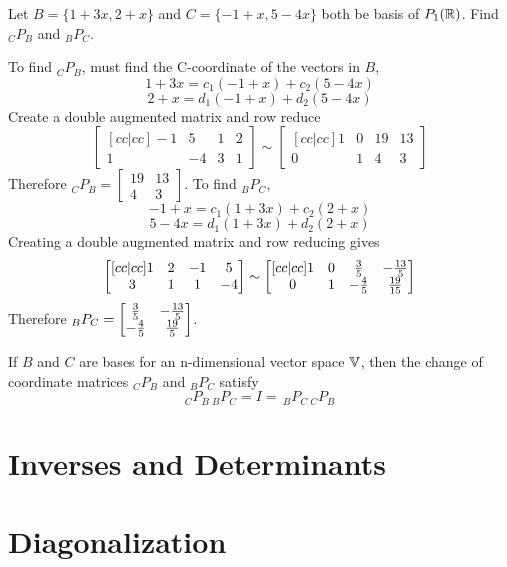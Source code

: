 \documentclass[english, 12pt]{article}
\begin{document}
\begin{exmp}
Let $B = \{1 + 3x,2+x\}$ and $C = \{-1+x,5-4x\}$ both be basis of $P_1({\mathbb{R}})$. Find $_CP_B$ and $_BP_C$.

\begin{sol}
To find $_CP_B$, must find the C-coordinate of the vectors in $B$,
\[1 + 3x = c_1 (-1 + x) + c_2 (5-4x)\]
\[2+x = d_1(-1+x) + d_2(5-4x)\]
Create a double augmented matrix and row reduce
\[\begin{bmatrix}[cc|cc] -1 & 5 & 1 & 2 \\ 1 & -4 & 3 & 1 \end{bmatrix} \sim \begin{bmatrix}[cc|cc] 1 & 0 & 19 & 13 \\ 0 & 1 & 4 & 3 \end{bmatrix}\]
Therefore $_CP_B = \begin{bmatrix} 19 & 13 \\ 4 & 3 \end{bmatrix}$. To find $_BP_C$,
\[-1 + x = c_1 (1 + 3x) + c_2 (2 + x)\]
\[5 - 4x = d_1(1+3x) + d_2 (2+x)\]
Creating a double augmented matrix and row reducing gives
\[\begin{bmatrix}[cc|cc] 1 & 2 & -1 & 5 \\ 3 & 1 & 1 & -4 \end{bmatrix} \sim \begin{bmatrix}[cc|cc] 1 & 0 & \frac{3}{5} & - \frac{13}{5} \\ 0 & 1 & - \frac{4}{5} & \frac{19}{15} \end{bmatrix}\]
Therefore $_BP_C = \begin{bmatrix} \frac{3}{5} & -\frac{13}{5} \\ - \frac{4}{5} & \frac{19}{5} \end{bmatrix}$.
\end{sol}
\end{exmp}

\begin{thrm}
If $B$ and $C$ are bases for an n-dimensional vector space ${\mathbb{V}}$, then the change of coordinate matrices $_CP_B$ and $_BP_C$ satisfy
\[_CP_B\,_BP_C = I = \,_BP_C\,_CP_B\]
\end{thrm}

\section{Inverses and Determinants}

\section{Diagonalization}
\end{document}
